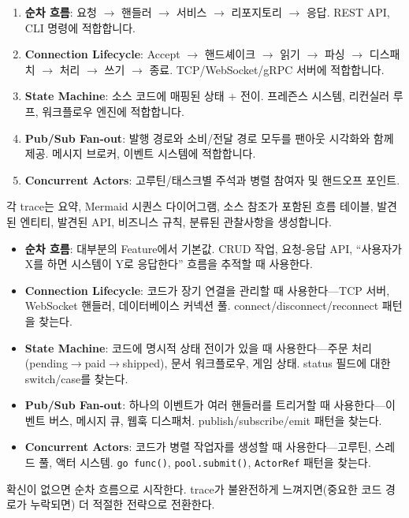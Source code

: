 \documentclass[11pt,a4paper,openright,twoside]{report}
\begin{document}
\begin{enumerate}
  \item \textbf{순차 흐름}: 요청 $\rightarrow$ 핸들러 $\rightarrow$ 서비스 $\rightarrow$ 리포지토리 $\rightarrow$ 응답. REST API, CLI 명령에 적합합니다.
  \item \textbf{Connection Lifecycle}: Accept $\rightarrow$ 핸드셰이크 $\rightarrow$ 읽기 $\rightarrow$ 파싱 $\rightarrow$ 디스패치 $\rightarrow$ 처리 $\rightarrow$ 쓰기 $\rightarrow$ 종료. TCP/WebSocket/gRPC 서버에 적합합니다.
  \item \textbf{State Machine}: 소스 코드에 매핑된 상태 + 전이. 프레즌스 시스템, 리컨실러 루프, 워크플로우 엔진에 적합합니다.
  \item \textbf{Pub/Sub Fan-out}: 발행 경로와 소비/전달 경로 모두를 팬아웃 시각화와 함께 제공. 메시지 브로커, 이벤트 시스템에 적합합니다.
  \item \textbf{Concurrent Actors}: 고루틴/태스크별 주석과 병렬 참여자 및 핸드오프 포인트.
\end{enumerate}

각 trace는 요약, Mermaid 시퀀스 다이어그램, 소스 참조가 포함된 흐름 테이블, 발견된 엔티티, 발견된 API, 비즈니스 규칙, 분류된 관찰사항을 생성합니다.

\begin{tipbox}
\begin{itemize}[nosep]
\item \textbf{순차 흐름}: 대부분의 Feature에서 기본값. CRUD 작업, 요청-응답 API, ``사용자가 X를 하면 시스템이 Y로 응답한다'' 흐름을 추적할 때 사용한다.
\item \textbf{Connection Lifecycle}: 코드가 장기 연결을 관리할 때 사용한다---TCP 서버, WebSocket 핸들러, 데이터베이스 커넥션 풀. connect/disconnect/reconnect 패턴을 찾는다.
\item \textbf{State Machine}: 코드에 명시적 상태 전이가 있을 때 사용한다---주문 처리(pending$\rightarrow$paid$\rightarrow$shipped), 문서 워크플로우, 게임 상태. status 필드에 대한 switch/case를 찾는다.
\item \textbf{Pub/Sub Fan-out}: 하나의 이벤트가 여러 핸들러를 트리거할 때 사용한다---이벤트 버스, 메시지 큐, 웹훅 디스패처. publish/subscribe/emit 패턴을 찾는다.
\item \textbf{Concurrent Actors}: 코드가 병렬 작업자를 생성할 때 사용한다---고루틴, 스레드 풀, 액터 시스템. \texttt{go func()}, \texttt{pool.submit()}, \texttt{ActorRef} 패턴을 찾는다.
\end{itemize}
확신이 없으면 순차 흐름으로 시작한다. trace가 불완전하게 느껴지면(중요한 코드 경로가 누락되면) 더 적절한 전략으로 전환한다.
\end{tipbox}
\end{document}
